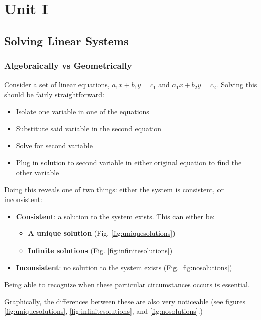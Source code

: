 \documentclass[12pt]{article}
\begin{document}
{
  \hypersetup{linkcolor=violet}
  \tableofcontents
}

\newpage
\section{Unit I}
\subsection{Solving Linear Systems}
\subsubsection{Algebraically vs Geometrically}
Consider a set of linear equations, $a_1 x+b_1 y = c_1$ and $a_1 x+b_2 y = c_2$. Solving this should be fairly straightforward:
\begin{itemize}
    \item Isolate one variable in one of the equations
    \item Substitute said variable in the second equation
    \item Solve for second variable
    \item Plug in solution to second variable in either original equation to find the other variable
\end{itemize}

Doing this reveals one of two things: either the system is consistent, or inconsistent:

\begin{itemize}\label{list:solntypes}
    \item \textbf{Consistent}: a solution to the system exists. This can either be:
    \begin{itemize}
        \item \textbf{A unique solution} (Fig. \ref{fig:uniquesolutions})
        \item \textbf{Infinite solutions} (Fig. \ref{fig:infinitesolutions})
    \end{itemize}
    \item \textbf{Inconsistent}: no solution to the system exists (Fig. \ref{fig:nosolutions})
\end{itemize}

Being able to recognize when these particular circumstances occurs is essential.

Graphically, the differences between these are also very noticeable (see figures  \ref{fig:uniquesolutions}, \ref{fig:infinitesolutions}, and \ref{fig:nosolutions}.)
\end{document}
